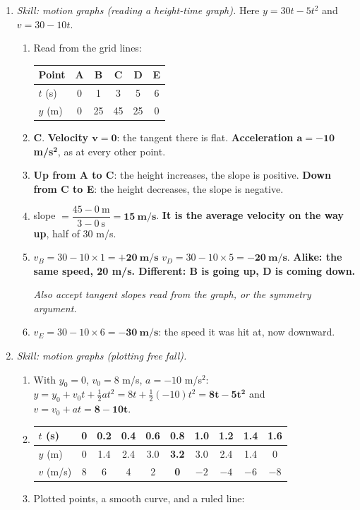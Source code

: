 \documentclass[12pt, twoside]{article}
\begin{document}
\begin{enumerate}[itemsep=0.5cm]
\item \emph{Skill: motion graphs (reading a height-time graph).} Here
  $y = 30t - 5t^2$ and $v = 30 - 10t$.
  \begin{enumerate}[itemsep=0.3cm]
    \item Read from the grid lines:

      {\renewcommand{\arraystretch}{1.4}%
      \begin{tabular}{| l | c | c | c | c | c |}
        \hline
        Point & A & B & C & D & E \\ \hline
        $t$ (s) & 0 & 1 & 3 & 5 & 6 \\ \hline
        $y$ (m) & 0 & 25 & 45 & 25 & 0 \\ \hline
      \end{tabular}}
    \item \textbf{C}. \textbf{Velocity $\mathbf{v = 0}$}: the tangent there is
      flat. \textbf{Acceleration $\mathbf{a = -10}$ m/s$^\mathbf{2}$}, as at every
      other point.
    \item \textbf{Up from A to C}: the height increases, the slope is positive.
      \textbf{Down from C to E}: the height decreases, the slope is negative.
    \item slope $= \dfrac{45 - 0~\text{m}}{3 - 0~\text{s}} =
      \mathbf{15~\textbf{m/s}}$. \textbf{It is the average velocity on the way up},
      half of 30 m/s.
    \item $v_B = 30 - 10 \times 1 = \mathbf{+20~\textbf{m/s}}$ \qquad
      $v_D = 30 - 10 \times 5 = \mathbf{-20~\textbf{m/s}}$. \textbf{Alike: the same
      speed, 20 m/s. Different: B is going up, D is coming down.}

      \emph{Also accept tangent slopes read from the graph, or the symmetry
      argument.}
    \item $v_E = 30 - 10 \times 6 = \mathbf{-30~\textbf{m/s}}$: the speed it was
      hit at, now downward.
  \end{enumerate}

\item \emph{Skill: motion graphs (plotting free fall).}
  \begin{enumerate}[itemsep=0.3cm]
    \item With $y_0 = 0$, $v_0 = 8$ m/s, $a = -10$ m/s$^2$:
      $y = y_0 + v_0 t + \frac{1}{2}at^2 = 8t + \frac{1}{2}(-10)t^2 =
      \mathbf{8t - 5t^2}$ \quad and \quad $v = v_0 + at = \mathbf{8 - 10t}$.
    \item

      {\renewcommand{\arraystretch}{1.4}%
      \begin{tabular}{| l | c | c | c | c | c | c | c | c | c |}
        \hline
        $t$ (s) & 0 & 0.2 & 0.4 & 0.6 & 0.8 & 1.0 & 1.2 & 1.4 & 1.6 \\ \hline
        $y$ (m) & 0 & 1.4 & 2.4 & 3.0 & \textbf{3.2} & 3.0 & 2.4 & 1.4 & 0 \\ \hline
        $v$ (m/s) & 8 & 6 & 4 & 2 & \textbf{0} & $-2$ & $-4$ & $-6$ & $-8$ \\
        \hline
      \end{tabular}}
    \item Plotted points, a smooth curve, and a ruled line:


\end{enumerate}
\end{enumerate}
\end{document}
